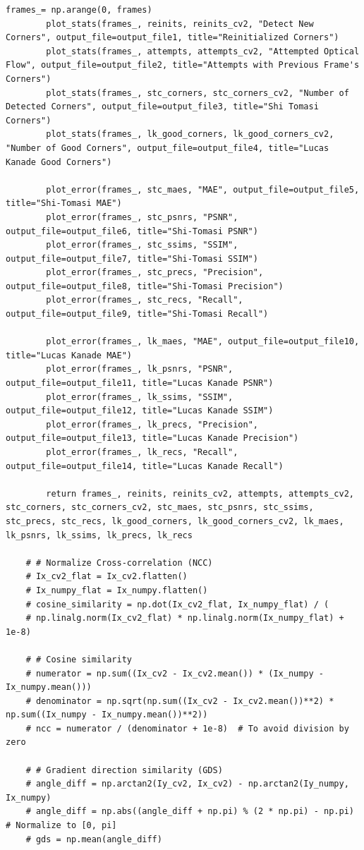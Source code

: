 \documentclass[11pt, conference, letterpaper]{IEEEtran}
\begin{document}
\begin{lstlisting}[style=python, caption={\texttt{utils.py}}, label={lst:utils}]
        frames_= np.arange(0, frames)
        plot_stats(frames_, reinits, reinits_cv2, "Detect New Corners", output_file=output_file1, title="Reinitialized Corners")
        plot_stats(frames_, attempts, attempts_cv2, "Attempted Optical Flow", output_file=output_file2, title="Attempts with Previous Frame's Corners")
        plot_stats(frames_, stc_corners, stc_corners_cv2, "Number of Detected Corners", output_file=output_file3, title="Shi Tomasi Corners")
        plot_stats(frames_, lk_good_corners, lk_good_corners_cv2, "Number of Good Corners", output_file=output_file4, title="Lucas Kanade Good Corners")
        
        plot_error(frames_, stc_maes, "MAE", output_file=output_file5, title="Shi-Tomasi MAE")
        plot_error(frames_, stc_psnrs, "PSNR", output_file=output_file6, title="Shi-Tomasi PSNR")
        plot_error(frames_, stc_ssims, "SSIM", output_file=output_file7, title="Shi-Tomasi SSIM")
        plot_error(frames_, stc_precs, "Precision", output_file=output_file8, title="Shi-Tomasi Precision")
        plot_error(frames_, stc_recs, "Recall", output_file=output_file9, title="Shi-Tomasi Recall")
        
        plot_error(frames_, lk_maes, "MAE", output_file=output_file10, title="Lucas Kanade MAE")
        plot_error(frames_, lk_psnrs, "PSNR", output_file=output_file11, title="Lucas Kanade PSNR")
        plot_error(frames_, lk_ssims, "SSIM", output_file=output_file12, title="Lucas Kanade SSIM")
        plot_error(frames_, lk_precs, "Precision", output_file=output_file13, title="Lucas Kanade Precision")
        plot_error(frames_, lk_recs, "Recall", output_file=output_file14, title="Lucas Kanade Recall")
    
        return frames_, reinits, reinits_cv2, attempts, attempts_cv2, stc_corners, stc_corners_cv2, stc_maes, stc_psnrs, stc_ssims, stc_precs, stc_recs, lk_good_corners, lk_good_corners_cv2, lk_maes, lk_psnrs, lk_ssims, lk_precs, lk_recs
    
    # # Normalize Cross-correlation (NCC)
    # Ix_cv2_flat = Ix_cv2.flatten()
    # Ix_numpy_flat = Ix_numpy.flatten()
    # cosine_similarity = np.dot(Ix_cv2_flat, Ix_numpy_flat) / (
    # np.linalg.norm(Ix_cv2_flat) * np.linalg.norm(Ix_numpy_flat) + 1e-8)
    
    # # Cosine similarity
    # numerator = np.sum((Ix_cv2 - Ix_cv2.mean()) * (Ix_numpy - Ix_numpy.mean()))
    # denominator = np.sqrt(np.sum((Ix_cv2 - Ix_cv2.mean())**2) * np.sum((Ix_numpy - Ix_numpy.mean())**2))
    # ncc = numerator / (denominator + 1e-8)  # To avoid division by zero
    
    # # Gradient direction similarity (GDS)
    # angle_diff = np.arctan2(Iy_cv2, Ix_cv2) - np.arctan2(Iy_numpy, Ix_numpy)
    # angle_diff = np.abs((angle_diff + np.pi) % (2 * np.pi) - np.pi)  # Normalize to [0, pi]
    # gds = np.mean(angle_diff)
\end{lstlisting}
\end{document}

